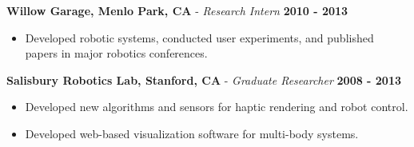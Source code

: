 \documentclass[line,margin]{res}
\newenvironment{compactlist}{
	\begin{itemize}\itemsep=0pt
}{
	\end{itemize}
}
\newcommand{\CVOnly}[1]{}
\newcommand{\CVOnly}[1]{#1}
\begin{document}
\begin{resume}
\begin{compactlist}
  \end{compactlist}
{\bf Willow Garage, Menlo Park, CA} - \emph{Research Intern}
  \hfill \textbf{2010 - 2013}
  \begin{compactlist}
      \item Developed robotic systems, conducted user experiments,
        and published papers in major robotics conferences.
  \end{compactlist}
{\bf Salisbury Robotics Lab, Stanford, CA} - \emph{Graduate Researcher}
  \hfill \textbf{2008 - 2013}
  \begin{compactlist}
    \item Developed new algorithms and sensors for haptic rendering and robot control.
    \item Developed web-based visualization software for multi-body systems.
  \end{compactlist}
\CVOnly{
{\bf Electrical Engineering Intern} - Qual-Tron, Inc., Tulsa, OK
  \hfill \textbf{2006 - 2007}
  \begin{compactlist}

\end{compactlist}}
\end{resume}
\end{document}
